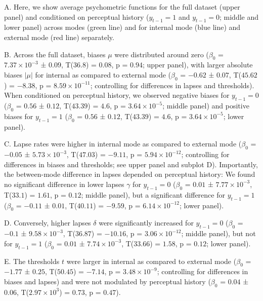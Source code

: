 \documentclass[
]{article}
\begin{document}
A. Here, we show average psychometric functions for the full dataset
(upper panel) and conditioned on perceptual history (\(y_{t-1} = 1\) and
\(y_{t-1} = 0\); middle and lower panel) across modes (green line) and
for internal mode (blue line) and external mode (red line) separately.

B. Across the full dataset, biases \(\mu\) were distributed around zero
(\(\beta_0\) = \(\ensuremath{7.37\times 10^{-3}}\) ± \(0.09\),
T(\(36.8\)) = \(0.08\), p = \(0.94\); upper panel), with larger absolute
biases \(|\mu|\) for internal as compared to external mode (\(\beta_0\)
= \(-0.62\) ± \(0.07\), T(\(45.62\)) = \(-8.38\), p =
\(\ensuremath{8.59\times 10^{-11}}\); controlling for differences in
lapses and thresholds). When conditioned on perceptual history, we
observed negative biases for \(y_{t-1} = 0\) (\(\beta_0\) = \(0.56\) ±
\(0.12\), T(\(43.39\)) = \(4.6\), p =
\(\ensuremath{3.64\times 10^{-5}}\); middle panel) and positive biases
for \(y_{t-1} = 1\) (\(\beta_0\) = \(0.56\) ± \(0.12\), T(\(43.39\)) =
\(4.6\), p = \(\ensuremath{3.64\times 10^{-5}}\); lower panel).

C. Lapse rates were higher in internal mode as compared to external mode
(\(\beta_0\) = \(-0.05\) ± \(\ensuremath{5.73\times 10^{-3}}\),
T(\(47.03\)) = \(-9.11\), p = \(\ensuremath{5.94\times 10^{-12}}\);
controlling for differences in biases and thresholds; see upper panel
and subplot D). Importantly, the between-mode difference in lapses
depended on perceptual history: We found no significant difference in
lower lapses \(\gamma\) for \(y_{t-1} = 0\) (\(\beta_0\) = \(0.01\) ±
\(\ensuremath{7.77\times 10^{-3}}\), T(\(33.1\)) = \(1.61\), p =
\(0.12\); middle panel), but a significant difference for
\(y_{t-1} = 1\) (\(\beta_0\) = \(-0.11\) ± \(0.01\), T(\(40.11\)) =
\(-9.59\), p = \(\ensuremath{6.14\times 10^{-12}}\); lower panel).

D. Conversely, higher lapses \(\delta\) were significantly increased for
\(y_{t-1} = 0\) (\(\beta_0\) = \(-0.1\) ±
\(\ensuremath{9.58\times 10^{-3}}\), T(\(36.87\)) = \(-10.16\), p =
\(\ensuremath{3.06\times 10^{-12}}\); middle panel), but not for
\(y_{t-1} = 1\) (\(\beta_0\) = \(0.01\) ±
\(\ensuremath{7.74\times 10^{-3}}\), T(\(33.66\)) = \(1.58\), p =
\(0.12\); lower panel).

E. The thresholds \(t\) were larger in internal as compared to external
mode (\(\beta_0\) = \(-1.77\) ± \(0.25\), T(\(50.45\)) = \(-7.14\), p =
\(\ensuremath{3.48\times 10^{-9}}\); controlling for differences in
biases and lapses) and were not modulated by perceptual history
(\(\beta_0\) = \(0.04\) ± \(0.06\),
T(\(\ensuremath{2.97\times 10^{3}}\)) = \(0.73\), p = \(0.47\)).
\end{document}
